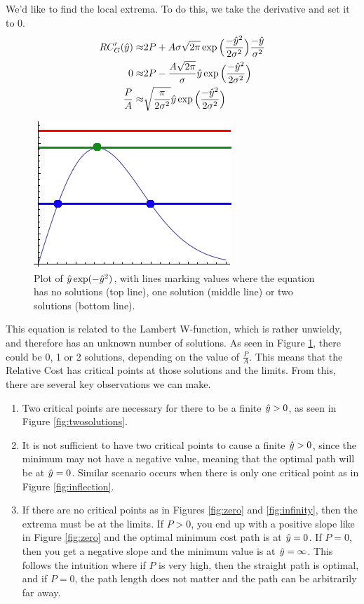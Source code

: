 We'd like to find the local extrema. To do this, we take the derivative and set it to 0. 
\begin{align}
RC'_G(\hat{y}) \approx& 2P + A\sigma\sqrt{2\pi}             \exp\Big( \frac{-\hat{y}^2}{2\sigma^2} \Big) \frac{-\hat{y}}{\sigma^2}\notag\\
0  \approx& 2P - \frac{A\sqrt{2\pi}}{\sigma}        \hat{y} \exp\Big( \frac{-\hat{y}^2}{2\sigma^2} \Big) \notag\\
  \frac{P}{A} \approx& \sqrt{\frac{\pi}{2\sigma^2}} \hat{y} \exp\Big( \frac{-\hat{y}^2}{2\sigma^2} \Big) 
\end{align}
\begin{figure}
\centering
\includegraphics[width=0.4\columnwidth]{graphix/lambert.png}
\caption{Plot of $\hat{y} \exp(-\hat{y}^2)$, with lines marking values where the equation has no solutions (top line), one solution (middle line) or two solutions (bottom line).}
\label{fig:lambert}
\end{figure}

This equation is related to the Lambert W-function, which is rather unwieldy, and therefore has an unknown number of solutions. As seen in Figure \ref{fig:lambert}, there could be 0, 1 or 2 solutions, depending on the value of $\frac{P}{A}$. This means that the Relative Cost has critical points at those solutions and the limits. From this, there are several key observations we can make. 
\begin{enumerate}
\item Two critical points are necessary for there to be a finite $\hat{y}>0$, as seen in Figure \ref{fig:twosolutions}. 
\item It is not sufficient to have two critical points to cause a finite $\hat{y}>0$, since the minimum may not have a negative value, meaning that the optimal path will be at $\hat{y}=0$. Similar scenario occurs when there is only one critical point as in Figure \ref{fig:inflection}. 
\item If there are no critical points as in Figures \ref{fig:zero} and \ref{fig:infinity}, then the extrema must be at the limits. If $P>0$, you end up with a positive slope like in Figure \ref{fig:zero} and the optimal minimum cost path is at $\hat{y}=0$. If $P=0$, then you get a negative slope and the minimum value is at $\hat{y}=\infty$. This follows the intuition where if $P$ is very high, then the straight path is optimal, and if $P=0$, the path length does not matter and the path can be arbitrarily far away. 
\end{enumerate}


